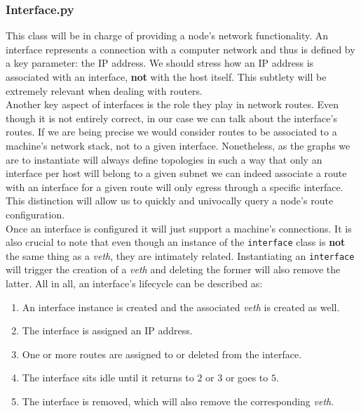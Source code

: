 \subsubsection{Interface.py}
    This class will be in charge of providing a node's network functionality. An interface represents a connection with a computer network and thus is defined by a key parameter: the IP address. We should stress how an IP address is associated with an interface, \textbf{not} with the host itself. This subtlety will be extremely relevant when dealing with routers.\\

    Another key aspect of interfaces is the role they play in network routes. Even though it is not entirely correct, in our case we can talk about the interface's routes. If we are being precise we would consider routes to be associated to a machine's network stack, not to a given interface. Nonetheless, as the graphs we are to instantiate will always define topologies in such a way that only an interface per host will belong to a given subnet we can indeed associate a route with an interface for a given route will only egress through a specific interface. This distinction will allow us to quickly and univocally query a node's route configuration.\\

    Once an interface is configured it will just support a machine's connections. It is also crucial to note that even though an instance of the \texttt{interface} class is \textbf{not} the same thing as a \textit{veth}, they are intimately related. Instantiating an \texttt{interface} will trigger the creation of a \textit{veth} and deleting the former will also remove the latter. All in all, an interface's lifecycle can be described as:\\

    \begin{enumerate}
        \item An interface instance is created and the associated \textit{veth} is created as well.
        \item The interface is assigned an IP address.
        \item One or more routes are assigned to or deleted from the interface.
        \item The interface sits idle until it returns to $2$ or $3$ or goes to $5$.
        \item The interface is removed, which will also remove the corresponding \textit{veth}.
    \end{enumerate}

